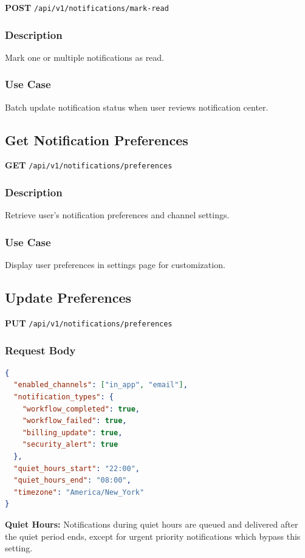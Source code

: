 \documentclass[11pt,a4paper]{report}
\begin{document}
\textbf{POST} \texttt{/api/v1/notifications/mark-read}

\subsubsection{Description}
Mark one or multiple notifications as read.

\subsubsection{Use Case}
Batch update notification status when user reviews notification center.

\subsection{Get Notification Preferences}

\textbf{GET} \texttt{/api/v1/notifications/preferences}

\subsubsection{Description}
Retrieve user's notification preferences and channel settings.

\subsubsection{Use Case}
Display user preferences in settings page for customization.

\subsection{Update Preferences}

\textbf{PUT} \texttt{/api/v1/notifications/preferences}

\subsubsection{Request Body}
\begin{lstlisting}[style=jsoncode,language=json]
{
  "enabled_channels": ["in_app", "email"],
  "notification_types": {
    "workflow_completed": true,
    "workflow_failed": true,
    "billing_update": true,
    "security_alert": true
  },
  "quiet_hours_start": "22:00",
  "quiet_hours_end": "08:00",
  "timezone": "America/New_York"
}
\end{lstlisting}

\begin{infobox}
\textbf{Quiet Hours:}
Notifications during quiet hours are queued and delivered after the quiet period ends, except for urgent priority notifications which bypass this setting.
\end{infobox}
\end{document}
